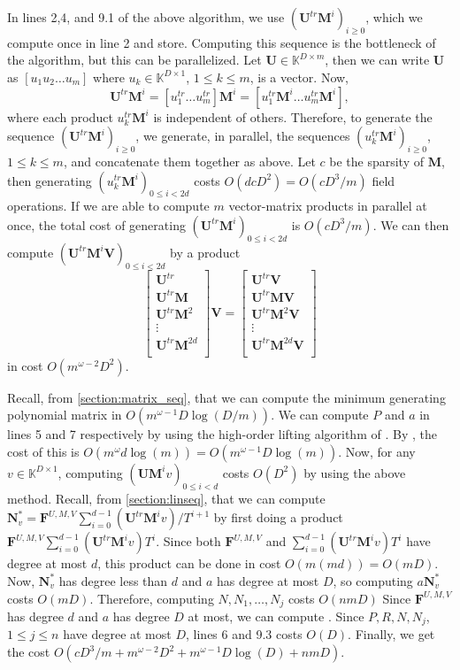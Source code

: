 \documentclass[12pt]{article}
\def\mF{\mathbf{F}}
\def\mM{\mathbf{M}}
\def\mN{\mathbf{N}}
\def\mU{\mathbf{U}}
\def\mV{\mathbf{V}}
\begin{document}
In lines 2,4, and 9.1 of the above algorithm, we use $(\mU^{tr}\mM^i)_{i\ge 0}$, which we compute once
in line 2 and store. Computing this sequence is the bottleneck of the algorithm, but this can be
parallelized. Let $\mU \in \mathbb{K}^{D \times m}$, then we can write $\mU$ as $[u_1 u_2 \dots u_m]$ where
$u_k \in \mathbb{K}^{D \times 1}$, $1 \le k \le m$, is a vector. Now,
$$ \mU^{tr} \mM^i = [u_1^{tr} \dots u_m^{tr}] \mM^i = [u_1^{tr} \mM^i \dots u_m^{tr} \mM^i],$$
where each product $u_k^{tr} \mM^i$ is independent of others. Therefore, to generate the
sequence $(\mU^{tr}\mM^i)_{i\ge0}$, we generate, in parallel, 
the sequences $(u_k^{tr} \mM^i)_{i\ge0}$, $1 \le k \le m$, and concatenate them together as above.
Let $c$ be the sparsity of $\mM$, then generating $(u_k^{tr} \mM^i)_{0 \le i < 2d}$ costs 
$O(d cD^2) = O(cD^3/m )$ field operations. If we are able to compute $m$ 
vector-matrix products in parallel at once, the total cost of generating $(\mU^{tr}\mM^i)_{0 \le i < 2d}$
is $O(cD^3/m)$. We can then compute $(\mU^{tr}\mM^i\mV)_{0 \le i < 2d}$ by a product
$$
\begin{bmatrix}
\mU^{tr}\\
\mU^{tr} \mM\\
\mU^{tr} \mM^2\\
\vdots\\
\mU^{tr} \mM^{2d}\\
\end{bmatrix} \mV
= 
\begin{bmatrix}
\mU^{tr} \mV\\
\mU^{tr} \mM \mV\\
\mU^{tr} \mM^2 \mV\\
\vdots \\
\mU^{tr} \mM^{2d} \mV\\
\end{bmatrix}
$$
in cost $O(m^{\omega-2}D^2)$.

Recall, from \cref{section:matrix_seq}, that we can compute
the minimum generating polynomial matrix in $O(m^{\omega-1} D \log(D/m))$.
We can compute $P$ and $a$ in lines 5 and 7 respectively by using the high-order
lifting algorithm of \cite[Algorithm~5]{Stor03}. 
By \cite[Corollary~16]{Stor03}, the cost of this is 
$O(m^{\omega} d \log(m)) = O(m^{\omega-1} D \log(m))$.
Now, for any $v\in\mathbb{K}^{D \times 1}$, computing $(\mU \mM^i v)_{0\le i < d}$ costs
$O(D^2)$ by using the above method. Recall, from \cref{section:linseq}, that
we can compute $\mN_v^* = \mF^{U,M,V}\sum_{i=0}^{d-1} {(\mU^{tr}\mM^iv)}/{T^{i+1}}$ by first
doing a product $\mF^{U,M,V}\sum_{i=0}^{d-1} {(\mU^{tr}\mM^iv)}T^i$.
Since both $\mF^{U,M,V}$ and $\sum_{i=0}^{d-1} {(\mU^{tr}\mM^iv)}T^i$
have degree at most $d$, this product can be done in cost $O(m(md)) = O(mD)$.
Now, $\mN_v^*$ has degree less than $d$ and $a$ has degree at most $D$, so
computing $a \mN_v^*$ costs $O(mD)$. Therefore, computing $N,N_1,\dots,N_j$ costs $O(nmD)$
Since $\mF^{U,M,V}$ has degree $d$ and $a$ has degree $D$ at most, we
can compute . Since $P,R,N,N_j$, $1\le j \le n$
have degree at most $D$, lines 6 and 9.3 costs $O(D)$.
Finally, we get the cost $O(cD^3/m + m^{\omega-2}D^2 + m^{\omega-1} D \log(D) + nmD )$.
\end{document}
